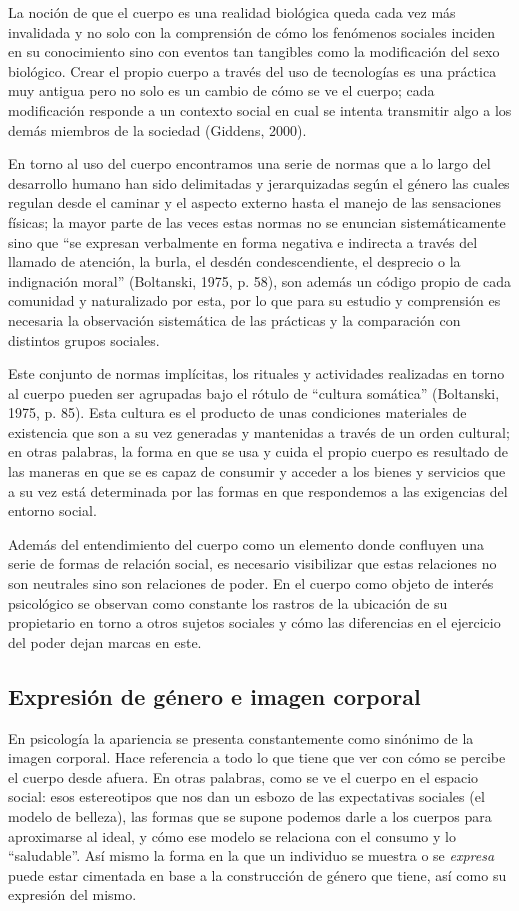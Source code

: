 La noción de que el cuerpo es una realidad biológica queda cada vez más
invalidada y no solo con la comprensión de cómo los fenómenos sociales inciden
en su conocimiento sino con eventos tan tangibles como la modificación del sexo
biológico.
Crear el propio cuerpo a través del uso de tecnologías es una práctica muy
antigua pero no solo es un cambio de cómo se ve el cuerpo;
cada modificación responde a un contexto social en cual se intenta transmitir
algo a los demás miembros de la sociedad (Giddens, 2000).

En torno al uso del cuerpo encontramos una serie de normas que a lo largo del
desarrollo humano han sido delimitadas y jerarquizadas según el género las
cuales regulan desde el caminar y el aspecto externo hasta el manejo de las
sensaciones físicas;
la mayor parte de las veces estas normas no se enuncian sistemáticamente sino
que “se expresan verbalmente en forma negativa e indirecta a través del
llamado de atención, la burla, el desdén condescendiente, el desprecio o la
indignación moral” (Boltanski, 1975, p. 58), son además un código propio de
cada comunidad y naturalizado por esta, por lo que para su estudio y comprensión
es necesaria la observación sistemática de las prácticas y la comparación con
distintos grupos sociales.

Este conjunto de normas implícitas, los rituales y actividades realizadas en
torno al cuerpo pueden ser agrupadas bajo el rótulo de “cultura somática”
(Boltanski, 1975, p. 85).
Esta cultura es el producto de unas condiciones materiales de existencia que son
a su vez generadas y mantenidas a través de un orden cultural;
en otras palabras, la forma en que se usa y cuida el propio cuerpo es
resultado de las maneras en que se es capaz de consumir y acceder a los
bienes y servicios que a su vez está determinada por las formas en que
respondemos a las exigencias del entorno social.

Además del entendimiento del cuerpo como un elemento donde confluyen una serie
de formas de relación social, es necesario visibilizar que estas relaciones no
son neutrales sino son relaciones de poder.
En el cuerpo como objeto de interés psicológico se observan como constante los
rastros de la ubicación de su propietario en torno a otros sujetos sociales y
cómo las diferencias en el ejercicio del poder dejan marcas en este.

\subsection{Expresión de género e imagen corporal}
En psicología la apariencia se presenta constantemente como sinónimo de la
imagen corporal.
Hace referencia a todo lo que tiene que ver con cómo se percibe el cuerpo desde
afuera.
En otras palabras, como se ve el cuerpo en el espacio social: esos estereotipos
que nos dan un esbozo de las expectativas sociales (el modelo de belleza), las
formas que se supone podemos darle a los cuerpos para aproximarse al ideal, y
cómo ese modelo se relaciona con el consumo y lo “saludable”.
Así mismo la forma en la que un individuo se muestra o se \emph{expresa} puede
estar
cimentada en base a la construcción de género que tiene, así como su expresión
del mismo.


